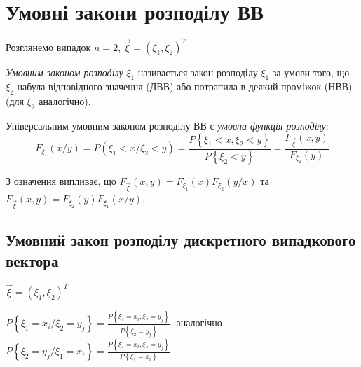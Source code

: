 
\section{Умовні закони розподілу ВВ}

Розглянемо випадок $n = 2$, $\vec{\xi} = \left(\xi_1, \xi_2\right)^T$

\begin{definition}
    \emph{Умовним законом розподілу} $\xi_1$ називається закон розподілу 
    $\xi_1$ за умови того, що $\xi_2$ набула відповідного значення (ДВВ) 
    або потрапила в деякий проміжок (НВВ) (для $\xi_2$ аналогічно).
\end{definition}

\begin{definition}
    Універсальним умовним законом розподілу ВВ є \emph{умовна функція 
    розподілу}:
    \begin{equation*}
        F_{\xi_1}(x/y) = P({\xi_1 < x}/{\xi_2 < y}) = 
        \frac{P\left\{\xi_1 < x, \xi_2 < y\right\}}
        {P\left\{\xi_2 < y\right\}} = 
        \frac{F_{\vec{\xi}}(x, y)}{F_{\xi_2}(y)}
    \end{equation*}
\end{definition}
\begin{remark}
    З означення випливає, що 
    $F_{\vec{\xi}}(x,y) = F_{\xi_1}(x)F_{\xi_2}(y/x)$
    та 
    $F_{\vec{\xi}}(x,y) = F_{\xi_2}(y)F_{\xi_1}(x/y)$.
\end{remark}
\subsection{Умовний закон розподілу дискретного випадкового вектора}
$\vec{\xi} = (\xi_1, \xi_2)^T$

$P\left\{\xi_1 = x_i / \xi_2 = y_j\right\} = 
\frac{P\left\{\xi_1 = x_i , \xi_2 = y_j\right\}}
{P\left\{\xi_2 = y_j\right\}}$, аналогічно 
$P\left\{\xi_2 = y_j / \xi_1 = x_i\right\} = 
\frac{P\left\{\xi_1 = x_i , \xi_2 = y_j\right\}}
{P\left\{\xi_1 = x_i\right\}}$

